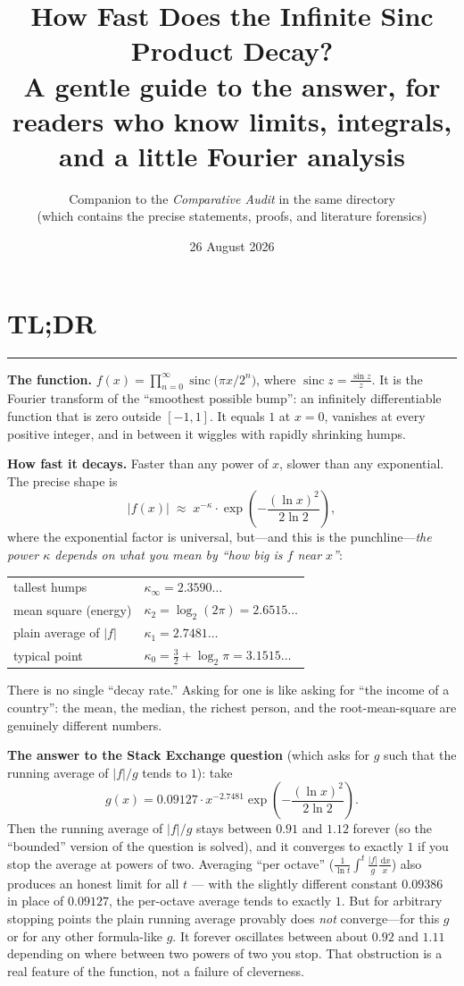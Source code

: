 \documentclass[11pt,oneside]{article}
\title{\bfseries How Fast Does the Infinite Sinc Product Decay?\\[0.35em]
\large A gentle guide to the answer, for readers who know limits,
integrals, and a little Fourier analysis}
\author{Companion to the \emph{Comparative Audit} in the same directory\\
\small (which contains the precise statements, proofs, and literature forensics)}
\date{26 August 2026}
\theoremstyle{remark}
\newcommand{\dd}{\,\mathrm d}
\newcommand{\sinc}{\operatorname{sinc}}
\begin{document}
\maketitle

\section*{TL;DR}

\hrule\vspace{0.9em}
\noindent
\textbf{The function.}
$f(x)=\prod_{n=0}^{\infty}\sinc\!\bigl(\pi x/2^n\bigr)$, where
$\sinc z=\frac{\sin z}{z}$.  It is the Fourier transform of the
``smoothest possible bump'': an infinitely differentiable function that
is zero outside $[-1,1]$.  It equals $1$ at $x=0$, vanishes at every
positive integer, and in between it wiggles with rapidly shrinking
humps.

\textbf{How fast it decays.}
Faster than any power of $x$, slower than any exponential.  The precise
shape is
\[
 |f(x)|\;\approx\;
 x^{-\kappa}\cdot
 \exp\!\left(-\frac{(\ln x)^2}{2\ln 2}\right),
\]
where the exponential factor is universal, but---and this is the
punchline---\emph{the power $\kappa$ depends on what you mean by
``how big is $f$ near $x$''}:
\begin{center}
\begin{tabular}{@{}ll@{}}
tallest humps & $\kappa_\infty=2.3590\ldots$\\
mean square (energy) & $\kappa_2=\log_2(2\pi)=2.6515\ldots$\\
plain average of $|f|$ & $\kappa_1=2.7481\ldots$\\
typical point & $\kappa_0=\tfrac32+\log_2\pi=3.1515\ldots$
\end{tabular}
\end{center}
There is no single ``decay rate.''  Asking for one is like asking for
``the income of a country'': the mean, the median, the richest person,
and the root-mean-square are genuinely different numbers.

\textbf{The answer to the Stack Exchange question} (which asks for
$g$ such that the running average of $|f|/g$ tends to $1$): take
\[
 g(x)=0.09127\cdot x^{-2.7481}
 \exp\!\left(-\frac{(\ln x)^2}{2\ln 2}\right).
\]
Then the running average of $|f|/g$ stays between $0.91$ and $1.12$
forever (so the ``bounded'' version of the question is solved), and it
converges to exactly $1$ if you stop the average at powers of two.
Averaging ``per octave'' ($\frac1{\ln t}\int^t\frac{|f|}{g}
\frac{\dd x}{x}$) also produces an honest limit for all $t$ --- with
the slightly different constant $0.09386$ in place of $0.09127$, the
per-octave average tends to exactly $1$.  But for arbitrary stopping
points the plain running average
provably does \emph{not} converge---for this $g$ or for any other
formula-like $g$.  It forever oscillates between about
$0.92$ and $1.11$ depending on where between two powers of two you
stop.  That obstruction is a real feature of the function, not a
failure of cleverness.
\end{document}
